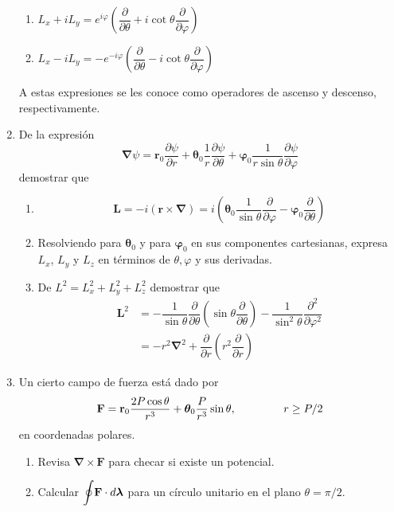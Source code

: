 \documentclass[12pt]{article}
\begin{document}
\begin{enumerate}
\begin{enumerate}
\item $L_{x} + i L_{y} = e^{i \varphi} \left( \dfrac{\partial}{\partial \theta} + i \cot \theta \dfrac{\partial}{\partial \varphi} \right)$
\item $L_{x} - i L_{y} = - e^{-i\varphi} \left( \dfrac{\partial}{\partial \theta} - i \cot \theta \dfrac{\partial}{\partial \varphi} \right) $
\end{enumerate}
A estas expresiones se les conoce como operadores de ascenso y descenso, respectivamente.
\item De la expresión
\[ \bm{\nabla} \psi = \mathbf{r}_{0} \dfrac{\partial \psi}{\partial r} + \bm{\theta}_{0} \dfrac{1}{r} \dfrac{\partial \psi}{\partial \theta} + \bm{\varphi}_{0} \dfrac{1}{r \sin \theta} \dfrac{\partial \psi}{\partial \varphi} \]
demostrar que
\begin{enumerate}
\item \[ \mathbf{L} = -i (\mathbf{r} \times \bm{\nabla}) = i \left( \bm{\theta}_{0} \dfrac{1}{\sin \theta} \dfrac{\partial}{\partial \varphi} - \bm{\varphi}_{0} \dfrac{\partial}{\partial \theta} \right)\]
\item Resolviendo para $\bm{\theta}_{0}$ y para $\bm{\varphi}_{0}$ en sus componentes cartesianas, expresa $L_{x}$, $L_{y}$ y $L_{z}$ en términos de $\theta,\varphi$ y sus derivadas.
\item De $L^{2} =  L_{x}^{2} + L_{y}^{2} + L_{z}^{2}$ demostrar que
\[ \begin{split}
\mathbf{L}^{2} &= - \dfrac{1}{\sin \theta} \dfrac{\partial}{\partial \theta} \left( \sin \theta \dfrac{\partial}{\partial \theta} \right) - \dfrac{1}{\sin^{2} \theta} \dfrac{\partial^{2}}{\partial \varphi^{2}} \\
&= -r^{2} \bm{\nabla}^{2} + \dfrac{\partial}{\partial r} \left( r^{2} \dfrac{\partial}{\partial r} \right)
\end{split} \]
\end{enumerate}
\item Un cierto campo de fuerza está dado por
\[ \mathbf{F} = \mathbf{r}_{0} \dfrac{2 P \cos \theta}{r^{3}} + \bm{\theta}_{0} \dfrac{P}{r^{3}} \sin \theta, \hspace{1.5cm} r \geq P/2 \]
en coordenadas polares.
\begin{enumerate}
\item Revisa $\bm{\nabla} \times \mathbf{F}$ para checar si existe un potencial.
\item Calcular $\mathlarger{\oint} \mathbf{F} \cdot d \bm{\lambda}$ para un círculo unitario en el plano $\theta = \pi/2$.\\

\end{enumerate}
\end{enumerate}
\end{document}
